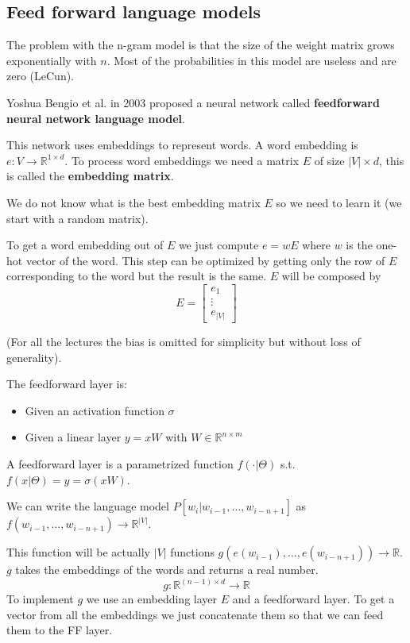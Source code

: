 \subsection{Feed forward language models}
\label{sec:feed_forward_language_models}

The problem with the n-gram model is that the size of the weight matrix grows exponentially with $n$.
Most of the probabilities in this model are useless and are zero (LeCun).

Yoshua Bengio et al. in 2003 proposed a neural network called \textbf{feedforward neural network language model}.

This network uses embeddings to represent words. A word embedding is $e: V\rightarrow\mathbb{R}^{1\times d}$.
To process word embeddings we need a matrix $E$ of size $|V|\times d$, this is called the \textbf{embedding matrix}.

We do not know what is the best embedding matrix $E$ so we need to learn it (we start with a random matrix).

To get a word embedding out of $E$ we just compute $e=wE$ where $w$ is the one-hot vector of the word.
This step can be optimized by getting only the row of $E$ corresponding to the word but the result is the same.
$E$ will be composed by 
\[
    E=\begin{bmatrix}
        e_1 \\
        \vdots \\
        e_{|V|}
    \end{bmatrix}
\]

(For all the lectures the bias is omitted for simplicity but without loss of generality).

The feedforward layer is:
\begin{itemize}
    \item Given an activation function $\sigma$
    \item Given a linear layer $y=xW$ with $W\in\mathbb{R}^{n\times m}$
\end{itemize}

A feedforward layer is a parametrized function $f(\cdot|\Theta)$
s.t. $f(x|\Theta)=y=\sigma(xW)$.

We can write the language model $P[w_i|w_{i-1},\dots,w_{i-n+1}]$ as \\
$f(w_{i-1},\dots,w_{i-n+1})\rightarrow\mathbb{R}^{|V|}$.

This function will be actually $|V|$ functions $g(e(w_{i-1}),\dots,e(w_{i-n+1}))\rightarrow\mathbb{R}$.
$g$ takes the embeddings of the words and returns a real number.
\[
    g: \mathbb{R}^{(n-1)\times d}\rightarrow\mathbb{R}
\]
To implement $g$ we use an embedding layer $E$ and a feedforward layer.
To get a vector from all the embeddings we just concatenate them so that we can feed them to the FF layer.

